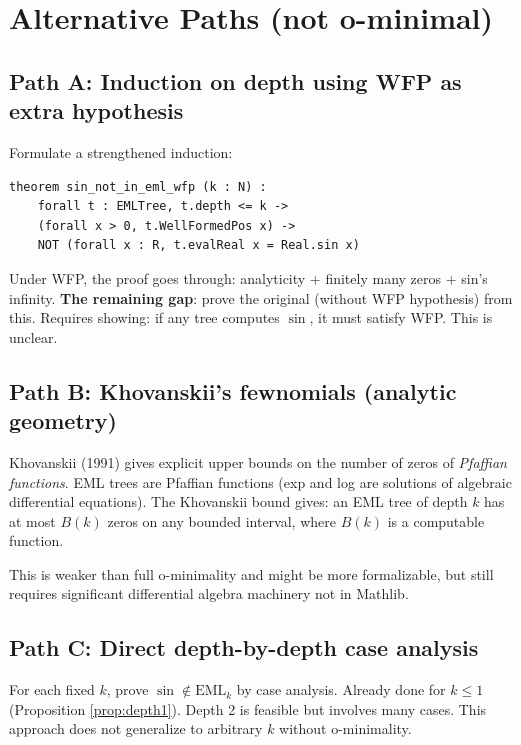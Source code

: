 \documentclass[12pt]{article}
\begin{document}
\section{Alternative Paths (not o-minimal)}

\subsection{Path A: Induction on depth using WFP as extra hypothesis}

Formulate a strengthened induction:
\begin{verbatim}
theorem sin_not_in_eml_wfp (k : N) :
    forall t : EMLTree, t.depth <= k ->
    (forall x > 0, t.WellFormedPos x) ->
    NOT (forall x : R, t.evalReal x = Real.sin x)
\end{verbatim}

Under WFP, the proof goes through: analyticity + finitely many zeros + sin's infinity.
\textbf{The remaining gap}: prove the original (without WFP hypothesis) from this.
Requires showing: if any tree computes $\sin$, it must satisfy WFP. This is unclear.

\subsection{Path B: Khovanskii's fewnomials (analytic geometry)}

Khovanskii (1991) gives explicit upper bounds on the number of zeros of \emph{Pfaffian functions}.
EML trees are Pfaffian functions (exp and log are solutions of algebraic differential equations).
The Khovanskii bound gives: an EML tree of depth $k$ has at most $B(k)$ zeros on any bounded interval,
where $B(k)$ is a computable function.

This is weaker than full o-minimality and might be more formalizable, but still requires
significant differential algebra machinery not in Mathlib.

\subsection{Path C: Direct depth-by-depth case analysis}

For each fixed $k$, prove $\sin \notin \mathrm{EML}_k$ by case analysis. Already done for $k \leq 1$
(Proposition \ref{prop:depth1}). Depth 2 is feasible but involves many cases.
This approach does not generalize to arbitrary $k$ without o-minimality.

\end{document}
